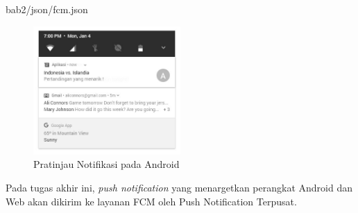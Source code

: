  {bab2/json/fcm.json}
\begin{figure}[H]
	\centering\includegraphics[width=0.5\textwidth]{bab2/img/fcm.jpg}
	\caption{Pratinjau Notifikasi pada Android}
	\label{img:contoh-hasil-fcm}
\end{figure}
\par Pada tugas akhir ini, \textit{push notification} yang menargetkan perangkat Android dan Web akan dikirim ke layanan FCM oleh Push Notification Terpusat.


